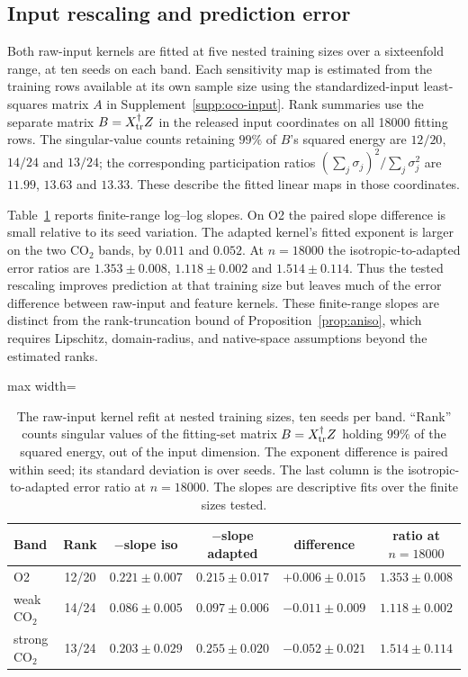 \subsection{Input rescaling and prediction error}
Both raw-input kernels are fitted at five nested
training sizes over a sixteenfold range, at ten seeds on each band.
Each sensitivity map is estimated from the training rows available at its
own sample size using the standardized-input least-squares matrix $A$ in
Supplement~\ref{supp:oco-input}. Rank summaries use the separate matrix
$B=X_{\rm tr}^{\dagger}Z$ in the released input coordinates on all 18000
fitting rows. The singular-value counts retaining $99\%$ of $B$'s squared
energy are $12/20$, $14/24$ and $13/24$; the corresponding participation
ratios $(\sum_j\sigma_j)^2/\sum_j\sigma_j^2$ are $11.99$, $13.63$ and
$13.33$. These describe the fitted linear maps in those coordinates.

Table~\ref{tab:aniso} reports finite-range log--log slopes. On O2 the paired
slope difference is small relative to its seed variation. The adapted
kernel's fitted exponent is larger on the two CO$_2$ bands, by $0.011$ and
$0.052$. At $n=18000$ the isotropic-to-adapted error ratios are
$1.353\pm0.008$, $1.118\pm0.002$ and $1.514\pm0.114$. Thus the tested
rescaling improves prediction at that training size but leaves much of
the error difference between raw-input and feature kernels. These finite-range slopes are distinct from the rank-truncation bound of
Proposition~\ref{prop:aniso}, which requires Lipschitz, domain-radius, and
native-space assumptions beyond the estimated ranks.

\begin{table}[t]
\centering
\caption{The raw-input kernel refit at nested training sizes, ten seeds per
band. ``Rank'' counts singular values of the fitting-set matrix $B=X_{\rm tr}^{\dagger}Z$
holding $99\%$ of the squared energy, out of the input dimension. The exponent
difference is paired within seed; its standard deviation is over seeds. The
last column is the isotropic-to-adapted error ratio at $n=18000$.
The slopes are descriptive fits over the finite sizes tested.}
\label{tab:aniso}
\begin{adjustbox}{max width=\linewidth}
\begin{tabular}{lccccc}
\toprule
Band & Rank & $-$slope iso & $-$slope adapted & difference & ratio at $n{=}18000$ \\
\midrule
O2         & 12/20 & $0.221\pm0.007$ & $0.215\pm0.017$ & $+0.006\pm0.015$ & $1.353\pm0.008$ \\
weak CO$_2$   & 14/24 & $0.086\pm0.005$ & $0.097\pm0.006$ & $-0.011\pm0.009$ & $1.118\pm0.002$ \\
strong CO$_2$ & 13/24 & $0.203\pm0.029$ & $0.255\pm0.020$ & $-0.052\pm0.021$ & $1.514\pm0.114$ \\
\bottomrule
\end{tabular}
\end{adjustbox}
\end{table}

